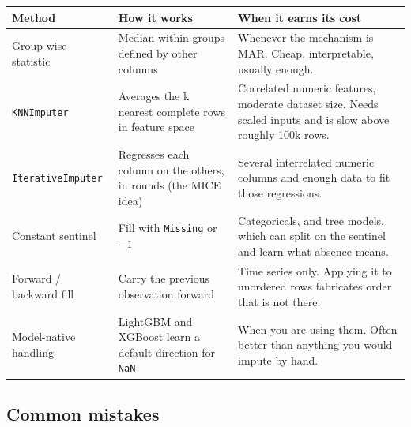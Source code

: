 \documentclass[11pt,a4paper]{article}
\begin{document}
\begin{tabularx}{\textwidth}{@{}l X X@{}}
\toprule
\rowcolor{tablehead} \textbf{Method} & \textbf{How it works} & \textbf{When it earns its cost} \\
\midrule
Group-wise statistic & Median within groups defined by other columns & Whenever the mechanism is MAR. Cheap, interpretable, usually enough. \\
\lstinline|KNNImputer| & Averages the k nearest complete rows in feature space & Correlated numeric features, moderate dataset size. Needs scaled inputs and is slow above roughly 100k rows. \\
\lstinline|IterativeImputer| & Regresses each column on the others, in rounds (the MICE idea) & Several interrelated numeric columns and enough data to fit those regressions. \\
Constant sentinel & Fill with \texttt{Missing} or $-1$ & Categoricals, and tree models, which can split on the sentinel and learn what absence means. \\
Forward / backward fill & Carry the previous observation forward & Time series only. Applying it to unordered rows fabricates order that is not there. \\
Model-native handling & LightGBM and XGBoost learn a default direction for \lstinline|NaN| & When you are using them. Often better than anything you would impute by hand. \\
\bottomrule
\end{tabularx}


\subsection*{Common mistakes}
\end{document}
